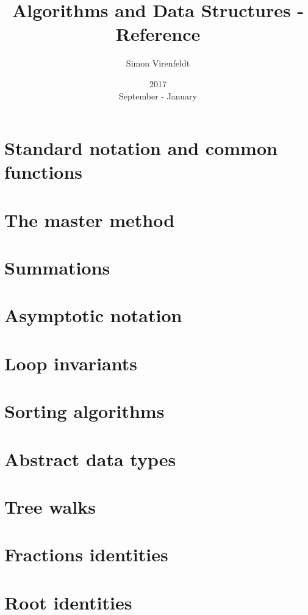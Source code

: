 \documentclass[10pt,a4paper,oneside]{article}
\author{Simon Virenfeldt}
\title{Algorithms and Data Structures - Reference}
\date{2017\\September - January}
\begin{document}
    \maketitle
    \section{Standard notation and common functions}
    
    \section{The master method}
    
    \section{Summations}
    
    \section{Asymptotic notation}
    
    \section{Loop invariants}
    
    \section{Sorting algorithms}
    
    \section{Abstract data types}
    
    \section{Tree walks}
    
    \section{Fractions identities}
    
    \section{Root identities}
    
\end{document}
